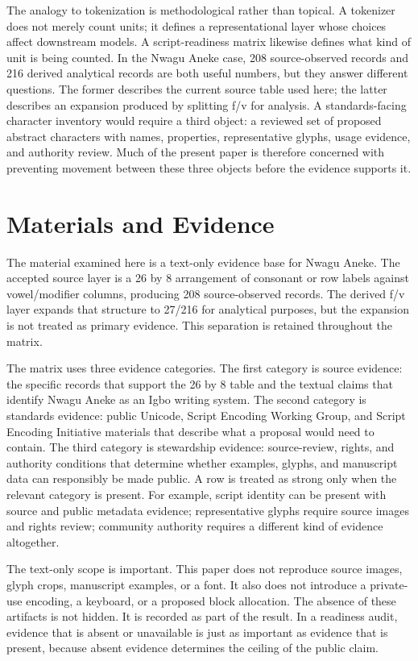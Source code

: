 \documentclass[sigconf,nonacm]{acmart}
\begin{document}
The analogy to tokenization is methodological rather than topical. A tokenizer
does not merely count units; it defines a representational layer whose choices
affect downstream models. A script-readiness matrix likewise defines what kind
of unit is being counted. In the Nwagu Aneke case, 208 source-observed records
and 216 derived analytical records are both useful numbers, but they answer
different questions. The former describes the current source table used here;
the latter describes an expansion produced by splitting f/v for analysis. A
standards-facing character inventory would require a third object: a reviewed
set of proposed abstract characters with names, properties, representative
glyphs, usage evidence, and authority review. Much of the present paper is
therefore concerned with preventing movement between these three objects before
the evidence supports it.

\section{Materials and Evidence}
The material examined here is a text-only evidence base for Nwagu Aneke. The
accepted source layer is a 26 by 8 arrangement of consonant or row labels against
vowel/modifier columns, producing 208 source-observed records. The derived f/v
layer expands that structure to 27/216 for analytical purposes, but the
expansion is not treated as primary evidence. This separation is retained
throughout the matrix.

The matrix uses three evidence categories. The first category is source
evidence: the specific records that support the 26 by 8 table and the textual
claims that identify Nwagu Aneke as an Igbo writing system. The second category
is standards evidence: public Unicode, Script Encoding Working Group, and
Script Encoding Initiative materials that describe what a proposal would need to
contain. The third category is stewardship evidence: source-review, rights, and
authority conditions that determine whether examples, glyphs, and manuscript
data can responsibly be made public. A row is treated as strong only when the
relevant category is present. For example, script identity can be present with
source and public metadata evidence; representative glyphs require source
images and rights review; community authority requires a different kind of
evidence altogether.

The text-only scope is important. This paper does not reproduce source images,
glyph crops, manuscript examples, or a font. It also does not introduce a
private-use encoding, a keyboard, or a proposed block allocation. The absence of
these artifacts is not hidden. It is recorded as part of the result. In a
readiness audit, evidence that is absent or unavailable is just as important as
evidence that is present, because absent evidence determines the ceiling of the
public claim.
\end{document}
